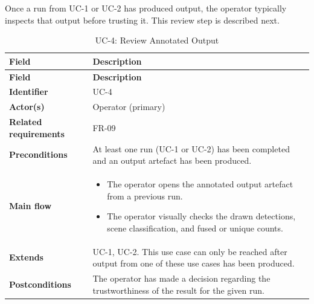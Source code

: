 
Once a run from UC-1 or UC-2 has produced output, the operator typically inspects that output before trusting it. This review step is described next.

\begin{longtable}{|
    >{\raggedright\arraybackslash}p{3.0cm}|
    >{\raggedright\arraybackslash}p{\dimexpr\textwidth-3.0cm-4\tabcolsep-3\arrayrulewidth\relax}|
}
\caption{UC-4: Review Annotated Output}
\label{tab:uc4} \\

\hline
\textbf{Field} & \textbf{Description} \\
\hline
\endfirsthead

\hline
\textbf{Field} & \textbf{Description} \\
\hline
\endhead

\textbf{Identifier} &
UC-4
\\
\hline

\textbf{Actor(s)} &
Operator (primary)
\\
\hline

\textbf{Related requirements} &
FR-09
\\
\hline

\textbf{Preconditions} &
At least one run (UC-1 or UC-2) has been completed and an output artefact has been produced.
\\
\hline

\textbf{Main flow} &
\begin{itemize}[leftmargin=16pt, itemsep=0pt, topsep=0pt]
    \item The operator opens the annotated output artefact from a previous run.

    \item The operator visually checks the drawn detections, scene classification, and fused or unique counts.
\end{itemize}
\\
\hline

\textbf{Extends} &
UC-1, UC-2. This use case can only be reached after output from one of these use cases has been produced.
\\
\hline

\textbf{Postconditions} &
The operator has made a decision regarding the trustworthiness of the result for the given run.
\\
\hline

\end{longtable}

